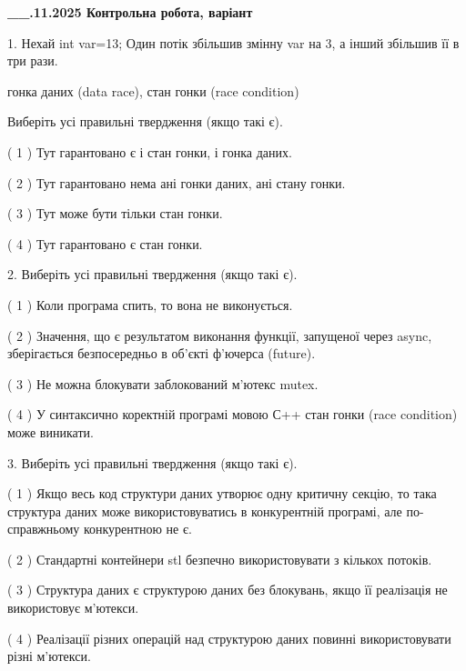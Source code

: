 \documentclass[12pt, ukrainian]{article}
\begin{document}
\newpage
\begin {large}

\textbf{\_\_.11.2025 Контрольна робота, варіант  }\par


{
1. Нехай int var=13; Один потік збільшив змінну var на 3, а інший збільшив її в три рази.

гонка даних (data race), стан гонки (race condition)

Виберіть усі правильні твердження (якщо такі є).\par
\vspace{2mm}
( 1 ) Тут гарантовано є і стан гонки, і гонка даних.%

( 2 ) Тут гарантовано нема ані гонки даних, ані стану гонки.%

( 3 ) Тут може бути тільки стан гонки.%

( 4 ) Тут гарантовано є стан гонки.%


2. Виберіть усі правильні твердження (якщо такі є).\par
\vspace{2mm}

( 1 ) Коли програма спить, то вона не виконується.%

( 2 ) Значення, що є результатом виконання функції, запущеної через async, зберігається безпосередньо в об’єкті ф’ючерса (future).%

( 3 ) Не можна блокувати заблокований м’ютекс mutex.%

( 4 ) У синтаксично коректній програмі мовою С++ стан гонки (race condition) може виникати.%


3. Виберіть усі правильні твердження (якщо такі є).\par
\vspace{2mm}

( 1 ) Якщо весь код структури даних утворює одну критичну секцію, то така структура даних може використовуватись в конкурентній програмі, але по-справжньо\-му конкурентною не є.%

( 2 ) Стандартні контейнери stl безпечно використовувати з кількох потоків.%

( 3 ) Структура даних є структурою даних без блокувань, якщо її реалізація не використовує м’ютекси.%

( 4 ) Реалізації різних операцій над структурою даних повинні використовувати різні м’ютекси.%


}
\end{large}
\end{document}
